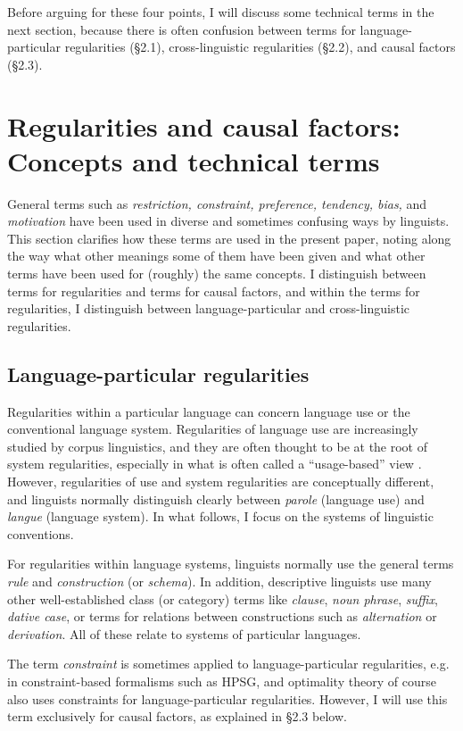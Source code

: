 \documentclass[output=paper]{langsci/langscibook}
\begin{document}
Before arguing for these four points, I will discuss some technical terms in the next section, because there is often confusion between terms for language-particular regularities (§2.1), cross-linguistic regularities (§2.2), and causal factors (§2.3).

\section{Regularities and causal factors: Concepts and technical terms}

General terms such as \textit{restriction, constraint, preference, tendency, bias,} and \textit{motivation} have been used in diverse and sometimes confusing ways by linguists. This section clarifies how these terms are used in the present paper, noting along the way what other meanings some of them have been given and what other terms have been used for (roughly) the same concepts. I distinguish between terms for regularities and terms for causal factors, and within the terms for regularities, I distinguish between language-particular and cross-linguistic regularities.

\subsection{Language-particular regularities}

Regularities within a particular language can concern language use or the conventional language system. Regularities of language use are increasingly studied by corpus linguistics, and they are often thought to be at the root of system regularities, especially in what is often called a “usage-based” view \citep{Bybee2010}. However, regularities of use and system regularities are conceptually different, and linguists normally distinguish clearly between \textit{parole} (language use) and \textit{langue} (language system). In what follows, I focus on the systems of linguistic conventions.

For regularities within language systems, linguists normally use the general terms \textit{rule} and \textit{construction} (or \textit{schema}). In addition, descriptive linguists use many other well-established class (or category) terms like \textit{clause}, \textit{noun phrase}, \textit{suffix}, \textit{dative case}, or terms for relations between constructions such as \textit{alternation} or \textit{derivation}. All of these relate to systems of particular languages.

The term \textit{constraint} is sometimes applied to language-particular regularities, e.g. in constraint-based formalisms such as HPSG, and optimality theory of course also uses constraints for language-particular regularities. However, I will use this term exclusively for causal factors, as explained in §2.3 below.
\end{document}
